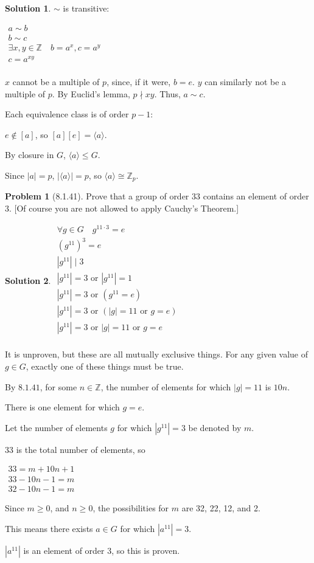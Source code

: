 \documentclass[12pt]{article}
\theoremstyle{definition}
\newtheorem*{prob}{Problem}
\newtheorem*{soln}{Solution}
\newcommand{\ZZ}{{\mathbb{Z}}}
\begin{document}
\begin{soln}
$\sim$ is transitive:

$\begin{gathered}
a\sim b\\
b\sim c\\
\exists x,y\in \ZZ \quad b=a^x,c=a^y\\
c=a^{xy}\\
\end{gathered}$

$x$ cannot be a multiple of $p$, since, if it were, $b=e$.
$y$ can similarly not be a multiple of $p$.
By Euclid's lemma, $p\nmid xy$.
Thus, $a\sim c$.

Each equivalence class is of order $p-1$:

$e\not\in [a]$, so $[a][e]=\langle a\rangle$.

By closure in $G$, $\langle a\rangle\leq G$.

Since $|a|=p$, $|\langle a\rangle|=p$, so $\langle a\rangle\cong \ZZ_p$.

\end{soln}


\begin{prob}[8.1.41]
Prove that a group of  order $33$ contains an element of order $3$.
[Of course you are not allowed to apply Cauchy's Theorem.]
\end{prob}

\begin{soln}\quad

$\begin{gathered}
\forall g\in G\quad g^{11\cdot 3}=e\\
(g^{11})^3=e\\
|g^{11}|\mid 3\\
|g^{11}|=3\text{ or }|g^{11}|=1\\
|g^{11}|=3\text{ or }(g^{11}=e)\\
|g^{11}|=3\text{ or }(|g|=11\text{ or }g=e)\\
|g^{11}|=3\text{ or }|g|=11\text{ or }g=e\\
\end{gathered}$

It is unproven, but these are all mutually exclusive things.
For any given value of $g\in G$, exactly one of these things must be true.

By $8.1.41$, for some $n\in\ZZ$, the number of elements for which
$|g|=11$ is $10n$.

There is one element for which $g=e$.

Let the number of elements $g$ for which $|g^{11}|=3$ be denoted by $m$.

33 is the total number of elements, so

$\begin{gathered}
33=m+10n+1\\
33-10n-1=m\\
32-10n-1=m
\end{gathered}$

Since $m\geq 0$, and $n\geq 0$, the possibilities for $m$ are 32, 22, 12, and 2.

This means there exists $a\in G$ for which $|a^{11}|=3$.

$|a^{11}|$ is an element of order 3, so this is proven.


\end{soln}
\end{document}
